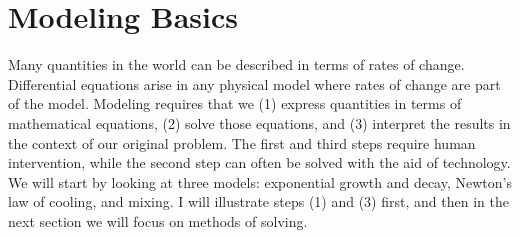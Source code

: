 %
%
%
% 




\section{Modeling Basics}
Many quantities in the world can be described in terms of rates of change. Differential equations arise in any physical model where rates of change are part of the model. Modeling requires that we (1) express quantities in terms of mathematical equations, (2) solve those equations, and (3) interpret the results in the context of our original problem.  The first and third steps require human intervention, while the second step can often be solved with the aid of technology. We will start by looking at three models: exponential growth and decay, Newton's law of cooling,  and mixing. I will illustrate steps (1) and (3) first, and then in the next section we will focus on methods of solving.


